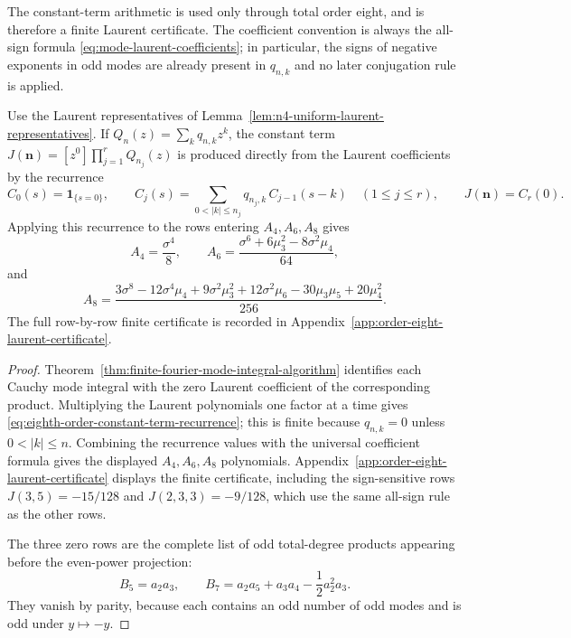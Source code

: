 The constant-term arithmetic is used only through total order eight, and is
therefore a finite Laurent certificate.  The coefficient convention is always
the all-sign formula \eqref{eq:mode-laurent-coefficients}; in particular, the
signs of negative exponents in odd modes are already present in \(q_{n,k}\)
and no later conjugation rule is applied.

\begin{lemma}%
\label{lem:eighth-order-coefficient-arithmetic}
Use the Laurent representatives of
Lemma~\ref{lem:n4-uniform-laurent-representatives}.  If
\(Q_n(z)=\sum_kq_{n,k}z^k\), the constant term
\(J(\mathbf n)=[z^0]\prod_{j=1}^rQ_{n_j}(z)\) is produced directly from the
Laurent coefficients by the recurrence
\begin{equation}\label{eq:eighth-order-constant-term-recurrence}
C_0(s)=\mathbf 1_{\{s=0\}},\qquad
C_j(s)=\sum_{0<|k|\le n_j}q_{n_j,k}\,C_{j-1}(s-k)
\quad(1\le j\le r),\qquad J(\mathbf n)=C_r(0).
\end{equation}
Applying this recurrence to the rows entering \(A_4,A_6,A_8\) gives
\[
A_4=\frac{\sigma^4}{8},\qquad
A_6=\frac{\sigma^6+6\mu_3^2-8\sigma^2\mu_4}{64},
\]
and
\[
A_8=
\frac{3\sigma^8-12\sigma^4\mu_4+9\sigma^2\mu_3^2
+12\sigma^2\mu_6-30\mu_3\mu_5+20\mu_4^2}{256}.
\]
The full row-by-row finite certificate is recorded in
Appendix~\ref{app:order-eight-laurent-certificate}.
\end{lemma}

\begin{proof}
Theorem~\ref{thm:finite-fourier-mode-integral-algorithm} identifies each
Cauchy mode integral with the zero Laurent coefficient of the corresponding
product.  Multiplying the Laurent polynomials one factor at a time gives
\eqref{eq:eighth-order-constant-term-recurrence}; this is finite because
\(q_{n,k}=0\) unless \(0<|k|\le n\).  Combining the recurrence values with
the universal coefficient formula gives the displayed \(A_4,A_6,A_8\)
polynomials.  Appendix~\ref{app:order-eight-laurent-certificate} displays
the finite certificate, including the sign-sensitive rows \(J(3,5)=-15/128\)
and \(J(2,3,3)=-9/128\), which use the same all-sign rule as the other rows.

The three zero rows are the complete list of odd total-degree products
appearing before the even-power projection:
\[
B_5=a_2a_3,\qquad
B_7=a_2a_5+a_3a_4-\frac12a_2^2a_3 .
\]
They vanish by parity, because each contains an odd number of odd modes and
is odd under \(y\mapsto-y\).
\end{proof}

